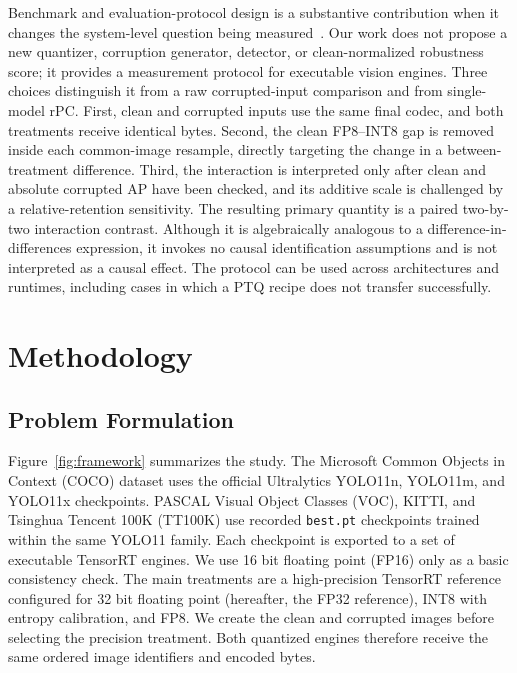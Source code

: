 \documentclass[a4paper,fleqn]{cas-dc}
\begin{document}
Benchmark and evaluation-protocol design is a substantive contribution when it changes the system-level question being measured~\citep{thacker2008performance,wen2020uadetrac}. Our work does not propose a new quantizer, corruption generator, detector, or clean-normalized robustness score; it provides a measurement protocol for executable vision engines. Three choices distinguish it from a raw corrupted-input comparison and from single-model rPC. First, clean and corrupted inputs use the same final codec, and both treatments receive identical bytes. Second, the clean FP8--INT8 gap is removed inside each common-image resample, directly targeting the change in a between-treatment difference. Third, the interaction is interpreted only after clean and absolute corrupted AP have been checked, and its additive scale is challenged by a relative-retention sensitivity. The resulting primary quantity is a paired two-by-two interaction contrast. Although it is algebraically analogous to a difference-in-differences expression, it invokes no causal identification assumptions and is not interpreted as a causal effect. The protocol can be used across architectures and runtimes, including cases in which a PTQ recipe does not transfer successfully.

\section{Methodology}
\label{sec:methods}

\subsection{Problem Formulation}
\label{sec:study-design}

Figure~\ref{fig:framework} summarizes the study. The Microsoft Common Objects in Context (COCO) dataset uses the official Ultralytics YOLO11n, YOLO11m, and YOLO11x checkpoints. PASCAL Visual Object Classes (VOC), KITTI, and Tsinghua Tencent 100K (TT100K) use recorded \texttt{best.pt} checkpoints trained within the same YOLO11 family. Each checkpoint is exported to a set of executable TensorRT engines. We use 16 bit floating point (FP16) only as a basic consistency check. The main treatments are a high-precision TensorRT reference configured for 32 bit floating point (hereafter, the FP32 reference), INT8 with entropy calibration, and FP8. We create the clean and corrupted images before selecting the precision treatment. Both quantized engines therefore receive the same ordered image identifiers and encoded bytes.
\end{document}
